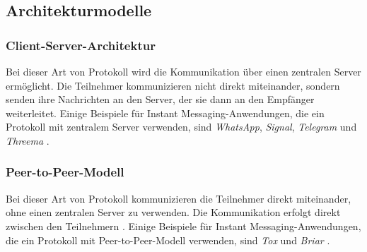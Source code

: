 \subsection{Architekturmodelle}

\subsubsection{Client-Server-Architektur}

Bei dieser Art von Protokoll wird die Kommunikation über einen zentralen Server ermöglicht. Die Teilnehmer kommunizieren nicht direkt miteinander, sondern senden ihre Nachrichten an den Server, der sie dann an den Empfänger weiterleitet\Parencite[S. 3]{Hanson_ServerManagement}. Einige Beispiele für Instant Messaging-Anwendungen, die ein Protokoll mit zentralem Server verwenden, sind \textit{WhatsApp}, \textit{Signal}, \textit{Telegram} und \textit{Threema} \Parencites{Vanerio_WhatsAppArchitecture}{Github_libsignal}{Telegram_ServerSourceCode}{Threema_ServerLocation}.

\subsubsection{Peer-to-Peer-Modell}

Bei dieser Art von Protokoll kommunizieren die Teilnehmer direkt miteinander, ohne einen zentralen Server zu verwenden. Die Kommunikation erfolgt direkt zwischen den Teilnehmern \parencites[S. 6-8]{Mahlmann_P2PNetzwerke}{Galuba_P2POverlayNetworks}. Einige Beispiele für Instant Messaging-Anwendungen, die ein Protokoll mit Peer-to-Peer-Modell verwenden, sind \textit{Tox} und \textit{Briar} \Parencites{Tox_FAQ}{Briar_HowItWorks}.